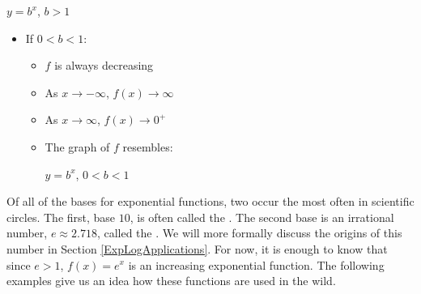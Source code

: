 {\begin{multicols}{2}
\begin{itemize}
\begin{itemize}
\begin{center}
$y = b^{x}$, $b > 1$
\end{center}

\end{itemize}

\end{itemize}


\begin{itemize}

\item  If $0<b<1$:

\begin{itemize}

\item  $f$ is always decreasing

\item  As $x \rightarrow -\infty$, $f(x) \rightarrow \infty$

\item  As $x \rightarrow \infty$, $f(x) \rightarrow 0^{+}$

\item  The graph of $f$ resembles:

\begin{center}

$y = b^{x}$, $0 < b < 1$
\end{center}

\end{itemize}

\end{itemize} 

\end{multicols}
}

\smallskip

Of all of the bases for exponential functions, two occur the most often in scientific circles.  The first, base $10$, is often called the .  The second base is an irrational number, $e \approx 2.718$, called the .  We will more formally discuss the origins of this number in Section \ref{ExpLogApplications}.  For now, it is enough to know that since $e > 1$, $f(x) = e^{x}$ is an increasing exponential function.  The following examples give us an idea how these functions are used in the wild.

\medskip

